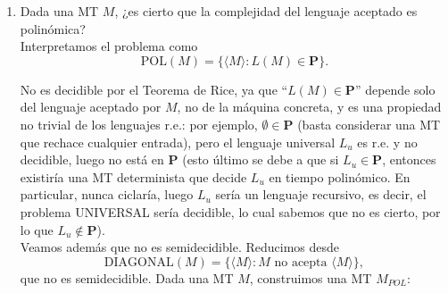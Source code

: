 \documentclass[12pt]{article}
\begin{document}
\begin{ejercicio}[2 puntos]
\begin{enumerate}
\begin{algorithm}
\begin{algorithmic}
                    \State Rechazamos.
                \end{algorithmic}
            \end{algorithm}

            Si algún $d_i = 0$, entonces el bloque $i$ es solución. Si hay $d_i > 0$ y $d_j < 0$ para $i,j \in \{1, \ldots, k\}$,
            escribimos $d_i = r > 0$, y $d_j = -s < 0$. Tomando $s$ copias del bloque $i$ y $r$ copias del bloque $j$,
            la diferencia total será $s \cdot r + r \cdot (-s) = 0$, luego hay solución. Si todos los $d_i$ son positivos,
            cualquier suma no vacía será positiva. Si, por otro lado, todos los $d_i$ son negativos, cualquier suma no vacía 
            será negativa. En ninguno de estos dos casos puede haber solución. Como el algoritmo solo recorre un número
            finito de bloques y siempre termina, el PCP sobre un alfabeto con un único símbolo es decidible.

            \item Dada una MT $M$, ¿es cierto que la complejidad del lenguaje aceptado es polinómica? \\
            
            Interpretamos el problema como
            $$
            \text{POL}(M)=\{\langle M\rangle : L(M)\in \mathbf{P}\}.
            $$

            No es decidible por el Teorema de Rice, ya que ``$L(M)\in \mathbf{P}$'' depende solo del lenguaje aceptado por $M$, no de la máquina concreta, y 
            es una propiedad no trivial de los lenguajes r.e.: por ejemplo, $\emptyset \in \mathbf{P}$ (basta considerar una MT que rechace cualquier entrada), pero el 
            lenguaje universal $L_u$ es r.e. y no decidible, luego no está en $\mathbf{P}$ (esto último se debe a que si $L_u \in \textbf{P}$, entonces existiría una MT 
            determinista que decide $L_u$ en tiempo polinómico. En particular, nunca ciclaría, luego $L_u$ sería un lenguaje recursivo, es decir, el problema UNIVERSAL 
            sería decidible, lo cual sabemos que no es cierto, por lo que $L_u \notin \textbf{P}$). \\

            Veamos además que no es semidecidible. Reducimos desde
            $$
            \text{DIAGONAL}(M)=\{\langle M\rangle : M \text{ no acepta } \langle M\rangle\},
            $$
            que no es semidecidible. Dada una MT $M$, construimos una MT $M_{POL}$:


\end{enumerate}
\end{ejercicio}
\end{document}
